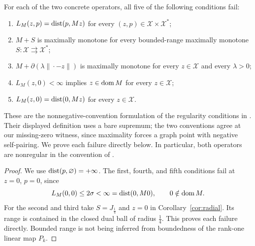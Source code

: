 \begin{corollary}\label{cor:regularity}
For each of the two concrete operators, all five of the following
conditions fail:
\begin{enumerate}
\item $L_M(z,p)=\operatorname{dist}(p,Mz)$ for every $(z,p)\in\mathcal X\times\mathcal X^*$;
\item $M+S$ is maximally monotone for every bounded-range maximally
monotone $S:\mathcal X\rightrightarrows\mathcal X^*$;
\item $M+\partial(\lambda\|\cdot-z\|)$ is maximally monotone for every
$z\in\mathcal X$ and every $\lambda>0$;
\item $L_M(z,0)<\infty$ implies $z\in\operatorname{dom} M$ for every $z\in\mathcal X$;
\item $L_M(z,0)=\operatorname{dist}(0,Mz)$ for every $z\in\mathcal X$.
\end{enumerate}
These are the nonnegative-convention formulation of the regularity
conditions in \cite[Theorem~2.3]{verona2012}. Their displayed definition
uses a bare supremum; the two conventions agree at our missing-zero
witness, since maximality forces a graph point with negative self-pairing.
We prove each failure directly below. In particular, both operators are
nonregular in the convention of \cite{verona2008}.
\end{corollary}
\begin{proof}
We use $\operatorname{dist}(p,\varnothing)=+\infty$. The first, fourth, and fifth
conditions fail at $z=0$, $p=0$, since
\[
L_M(0,0)\le2\sigma<\infty=\operatorname{dist}(0,M0),\qquad 0\notin\operatorname{dom} M.
\]
For the second and third take $S=J_{\frac{1}{4}}$ and $z=0$ in
Corollary~\ref{cor:radial}. Its range is contained in the closed dual
ball of radius $\frac{1}{4}$. This proves each failure directly. Bounded range
is not being inferred from boundedness of the rank-one linear map $P_k$.
\end{proof}

